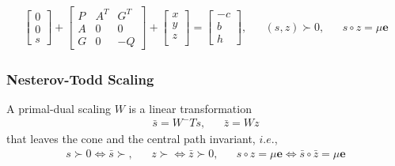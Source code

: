 \begin{equation}
	\begin{aligned}
		\begin{bmatrix}
			0\\
			0\\
			s
		\end{bmatrix}
		+
		\begin{bmatrix}
			P & A^T & G^T\\
			A & 0 & 0\\
			G & 0 & -Q
		\end{bmatrix}
		+\begin{bmatrix}
			x\\
			y\\
			z\\
		\end{bmatrix}
		=
		\begin{bmatrix}
			-c\\
			b\\
			h
		\end{bmatrix}
		,
		& & (s,z)\succ 0, & & s\circ z = \mu \textbf{e}
	\end{aligned}
	\label{eqn:cvxopt_central_path_2}
\end{equation}

\subsubsection*{Nesterov-Todd Scaling}

A primal-dual scaling $W$ is a linear transformation
\begin{equation*}
\begin{aligned}
	\bar{s} = W^-Ts, & & \bar{z}=Wz
\end{aligned}
\end{equation*}
that leaves the cone and the central path invariant, $i.e.$,
\begin{equation*}
\begin{aligned}
s\succ 0 \Leftrightarrow \bar{s}\succ,  & & z\succ \Leftrightarrow \bar{z}\succ 0, & & s\circ z=\mu \textbf{e} \Leftrightarrow \bar{s}\circ \bar{z} = \mu \textbf{e}
\end{aligned}
\end{equation*}

